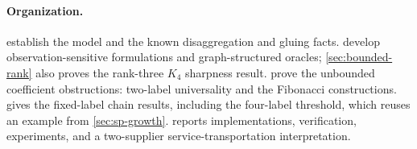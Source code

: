 \paragraph{Organization.}
 establish the model and the known
disaggregation and gluing facts. 
develop observation-sensitive formulations and graph-structured oracles;
\cref{sec:bounded-rank} also proves the rank-three $K_4$ sharpness result.
 prove the unbounded coefficient
obstructions: two-label universality and the Fibonacci constructions.
 gives the fixed-label chain results, including the
four-label threshold, which reuses an example from \cref{sec:sp-growth}.
 reports implementations, verification, experiments,
and a two-supplier service-transportation interpretation.
